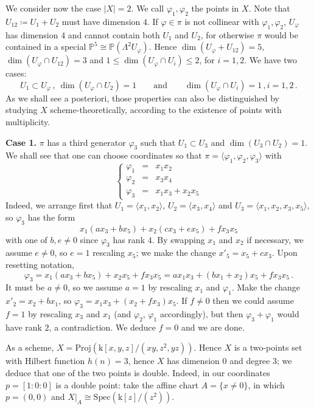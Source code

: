 \documentclass[10pt,reqno]{amsart}
\newcommand{\la}{\langle}
\newcommand{\ra}{\rangle}
\newcommand{\PP}{\mathbb P}
\newcommand{\f}{\varphi}
\renewcommand{\L}{\Lambda}
\newcommand{\kk}{\mathrm{k}}
\newcommand{\tr}[1]{\textrm{#1}}
\theoremstyle{definition}
\begin{document}
\noindent We consider now the case $|X|=2$. We call $\f_1, \f_2$ the points in $X$. Note that $U_{12}\coloneqq U_1 + U_2$ must have dimension $4$. If $\f\in\pi$ is not collinear with $\f_1, \f_2$, $U_\f$ has dimension $4$ and cannot contain both $U_1$ and $U_2$, for otherwise $\pi$ would be contained in a special $\PP^5\cong\PP(\L^2 U_{\f})$. Hence $\dim(U_\varphi+U_{12})=5$, $\dim(U_{\f} \cap U_{12})=3$ and $1\leq \dim(U_{\f} \cap U_i)\leq 2$, for $i=1,2$. We have two cases:
\[
U_1\subset U_{\f}\,, \ \dim(U_{\f} \cap U_2)=1 \qquad \tr{and} \qquad \dim(U_{\f} \cap U_i)=1\,, i=1,2\,.
\]
\noindent As we shall see a posteriori, those properties can also be distinguished by studying $X$ scheme-theoretically, according to the existence of points with multiplicity.

\noindent \textbf{Case 1.} $\pi$ has a third generator $\f_3$ such that $U_1\subset U_3$ and $\dim(U_3 \cap U_2)=1$. We shall see that one can choose coordinates so that $\pi=\la \f_1,\f_2,\f_3\ra$ with
\[ 
\left\{\begin{array}{ccl}
 \f_1 & = & x_1x_2\\
 \f_2 & = & x_3x_4\\
 \f_3 & = & x_1x_3+x_2x_5
\end{array}\right.
\]
Indeed, we arrange first that $U_1=\la x_1, x_2 \ra$, $U_2=\la x_3, x_4 \ra$ and $U_3=\la x_1, x_2, x_3, x_5 \ra$, so $\f_3$ has the form
\[
x_1(ax_3+bx_5)+x_2(cx_3+ex_5)+fx_3x_5
\]
with one of $b, e \ne 0$ since $\f_3$ has rank $4$. By swapping $x_1$ and $x_2$ if necessary, we assume $e\ne 0$, so $e=1$ rescaling $x_5$; we make the change $x'_5=x_5+cx_3$. Upon resetting notation, 
\[
\f_3=x_1(ax_3+bx_5)+x_2x_5+fx_3x_5=ax_1x_3+(bx_1+x_2)x_5+fx_3x_5 \,.
\]
It must be $a \ne 0$, so we assume $a=1$ by rescaling $x_1$ and $\f_1$. Make the change $x'_2=x_2+bx_1$, so $\f_3=x_1x_3+(x_2+fx_3)x_5$. If $f \ne 0$ then we could assume $f=1$ by rescaling $x_3$ and $x_1$ (and $\f_2$, $\f_1$ accordingly), but then $\f_3+\f_1$ would have rank $2$, a contradiction. We deduce $f=0$ and we are done.

\noindent As a scheme, $X=\mathrm{Proj}(\kk[x,y,z]/(xy,z^2,yz))$. Hence $X$ is a two-points set with Hilbert function $h(n)=3$, hence $X$ has dimension $0$ and degree $3$; we deduce that one of the two points is double. Indeed, in our coordinates $p=[1:0:0]$ is a double point: take the affine chart $A=\{x \ne 0\}$, in which $p=(0,0)$ and $X|_A \cong \mathrm{Spec}(\kk[z]/(z^2))$.
\end{document}
